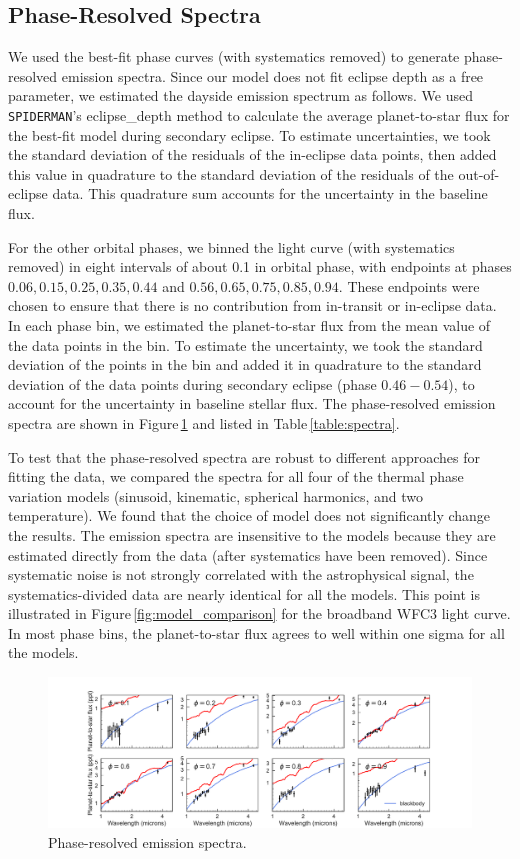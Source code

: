 \documentclass[twocolumn]{aastex61}
\begin{document}
\subsection{Phase-Resolved Spectra}
We used the best-fit phase curves (with systematics removed) to generate phase-resolved emission spectra.  Since our model does not fit eclipse depth as a free parameter, we estimated the dayside emission spectrum as follows. We used \texttt{SPIDERMAN}'s eclipse\_depth method to calculate the average planet-to-star flux for the best-fit model during secondary eclipse.  To estimate uncertainties, we took the standard deviation of the residuals of the in-eclipse data points, then added this value in quadrature to the standard deviation of the residuals of the out-of-eclipse data.  This quadrature sum accounts for the uncertainty in the baseline flux.

For the other orbital phases, we binned the light curve (with systematics removed) in eight intervals of about 0.1 in orbital phase, with endpoints at phases $0.06, 0.15, 0.25, 0.35, 0.44$ and $0.56, 0.65, 0.75, 0.85, 0.94$. These endpoints were chosen to ensure that there is no contribution from in-transit or in-eclipse data.  In each phase bin, we estimated the planet-to-star flux from the mean value of the data points in the bin. To estimate the uncertainty, we took the standard deviation of the points in the bin and added it in quadrature to the standard deviation of the data points during secondary eclipse (phase $0.46-0.54$), to account for the uncertainty in baseline stellar flux. The phase-resolved emission spectra are shown in Figure\,\ref{fig:spectra} and listed in Table\,\ref{table:spectra}.

To test that the phase-resolved spectra are robust to different approaches for fitting the data, we compared the spectra for all four of the thermal phase variation models (sinusoid, kinematic, spherical harmonics, and two temperature). We found that the choice of model does not significantly change the results.  The emission spectra are insensitive to the models because they are estimated directly from the data (after systematics have been removed). Since systematic noise is not strongly correlated with the astrophysical signal, the systematics-divided data are nearly identical for all the models.  This point is illustrated in Figure\,\ref{fig:model_comparison} for the broadband WFC3 light curve. In most phase bins, the planet-to-star flux agrees to well within one sigma for all the models. 

\begin{figure}
\includegraphics[width = 1.0\textwidth]{Figures/emission_spectra.pdf}
\caption{Phase-resolved emission spectra.}
\label{fig:spectra}
\end{figure}
\end{document}
